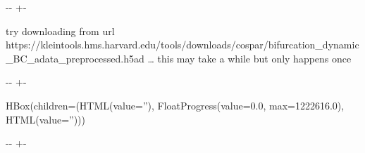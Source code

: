 \documentclass[letterpaper,10pt,english]{sphinxmanual}
\newlength\nbsphinxcodecellspacing
\begin{document}
{

\kern-\sphinxverbatimsmallskipamount\kern-\baselineskip
\kern+\FrameHeightAdjust\kern-\fboxrule
\vspace{\nbsphinxcodecellspacing}

\begin{sphinxVerbatim}[commandchars=\\\{\}]
try downloading from url
https://kleintools.hms.harvard.edu/tools/downloads/cospar/bifurcation\_dynamic\_BC\_adata\_preprocessed.h5ad
{\ldots} this may take a while but only happens once
\end{sphinxVerbatim}
}

{

\kern-\sphinxverbatimsmallskipamount\kern-\baselineskip
\kern+\FrameHeightAdjust\kern-\fboxrule
\vspace{\nbsphinxcodecellspacing}

\begin{sphinxVerbatim}[commandchars=\\\{\}]
HBox(children=(HTML(value=''), FloatProgress(value=0.0, max=1222616.0), HTML(value='')))
\end{sphinxVerbatim}
}

{

\kern-\sphinxverbatimsmallskipamount\kern-\baselineskip
\kern+\FrameHeightAdjust\kern-\fboxrule
\vspace{\nbsphinxcodecellspacing}

\begin{sphinxVerbatim}[commandchars=\\\{\}]

\end{sphinxVerbatim}
}

{
\begin{sphinxVerbatim}[commandchars=\\\{\}]
\llap{\color{nbsphinxin}[3]:\,\hspace{\fboxrule}\hspace{\fboxsep}}
\end{sphinxVerbatim}
}
\end{document}

